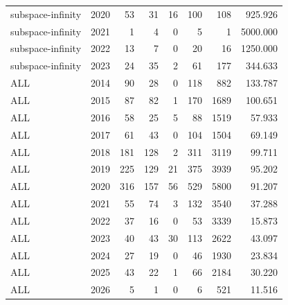 {\begin{longtable}{lrrrrrrr}
subspace-infinity & 2020 & 53 & 31 & 16 & 100 & 108 & 925.926 \\
subspace-infinity & 2021 & 1 & 4 & 0 & 5 & 1 & 5000.000 \\
subspace-infinity & 2022 & 13 & 7 & 0 & 20 & 16 & 1250.000 \\
subspace-infinity & 2023 & 24 & 35 & 2 & 61 & 177 & 344.633 \\
ALL & 2014 & 90 & 28 & 0 & 118 & 882 & 133.787 \\
ALL & 2015 & 87 & 82 & 1 & 170 & 1689 & 100.651 \\
ALL & 2016 & 58 & 25 & 5 & 88 & 1519 & 57.933 \\
ALL & 2017 & 61 & 43 & 0 & 104 & 1504 & 69.149 \\
ALL & 2018 & 181 & 128 & 2 & 311 & 3119 & 99.711 \\
ALL & 2019 & 225 & 129 & 21 & 375 & 3939 & 95.202 \\
ALL & 2020 & 316 & 157 & 56 & 529 & 5800 & 91.207 \\
ALL & 2021 & 55 & 74 & 3 & 132 & 3540 & 37.288 \\
ALL & 2022 & 37 & 16 & 0 & 53 & 3339 & 15.873 \\
ALL & 2023 & 40 & 43 & 30 & 113 & 2622 & 43.097 \\
ALL & 2024 & 27 & 19 & 0 & 46 & 1930 & 23.834 \\
ALL & 2025 & 43 & 22 & 1 & 66 & 2184 & 30.220 \\
ALL & 2026 & 5 & 1 & 0 & 6 & 521 & 11.516 \\
\end{longtable}
}

